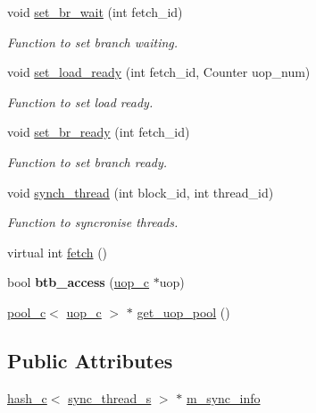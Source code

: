 \begin{DoxyCompactItemize}
void \hyperlink{classfrontend__c_a8c9c3728fc846b43c228ca04ad463922}{set\_\-br\_\-wait} (int fetch\_\-id)
\begin{DoxyCompactList}\small\item\em Function to set branch waiting. \item\end{DoxyCompactList}\item 
void \hyperlink{classfrontend__c_a2c7919fea8f85914c6f1b0c8c8a25b38}{set\_\-load\_\-ready} (int fetch\_\-id, Counter uop\_\-num)
\begin{DoxyCompactList}\small\item\em Function to set load ready. \item\end{DoxyCompactList}\item 
void \hyperlink{classfrontend__c_a76cc9138c2bf7b7cba2d9ddb06592179}{set\_\-br\_\-ready} (int fetch\_\-id)
\begin{DoxyCompactList}\small\item\em Function to set branch ready. \item\end{DoxyCompactList}\item 
void \hyperlink{classfrontend__c_a04cd3de5a5e1448591dc3c10e0d6f535}{synch\_\-thread} (int block\_\-id, int thread\_\-id)
\begin{DoxyCompactList}\small\item\em Function to syncronise threads. \item\end{DoxyCompactList}\item 
virtual int \hyperlink{classfrontend__c_ac7cc867e2d8fdaae428e88d429e60fad}{fetch} ()
\item 
\hypertarget{classfrontend__c_a714d783e783d648801f425ed0ea335ed}{
bool {\bfseries btb\_\-access} (\hyperlink{classuop__c}{uop\_\-c} $\ast$uop)}
\label{classfrontend__c_a714d783e783d648801f425ed0ea335ed}

\item 
\hyperlink{classpool__c}{pool\_\-c}$<$ \hyperlink{classuop__c}{uop\_\-c} $>$ $\ast$ \hyperlink{classfrontend__c_a464ef95a8aec46a681cb030d674ca446}{get\_\-uop\_\-pool} ()
\end{DoxyCompactItemize}
\subsection*{Public Attributes}
\begin{DoxyCompactItemize}
\item 
\hyperlink{classhash__c}{hash\_\-c}$<$ \hyperlink{structsync__thread__s}{sync\_\-thread\_\-s} $>$ $\ast$ \hyperlink{classfrontend__c_a0279b18722ea8be3dea43e4c255c8159}{m\_\-sync\_\-info}
\end{DoxyCompactItemize}
